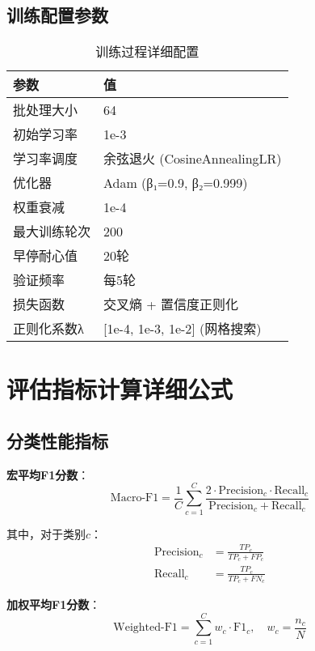 \subsection{训练配置参数}
\label{app:training_config}

\begin{table}[h]
\centering
\caption{训练过程详细配置}
\label{tab:training_config_details}
\begin{tabular}{ll}
\toprule
\textbf{参数} & \textbf{值} \\
\midrule
批处理大小 & 64 \\
初始学习率 & 1e-3 \\
学习率调度 & 余弦退火 (CosineAnnealingLR) \\
优化器 & Adam (β₁=0.9, β₂=0.999) \\
权重衰减 & 1e-4 \\
最大训练轮次 & 200 \\
早停耐心值 & 20轮 \\
验证频率 & 每5轮 \\
损失函数 & 交叉熵 + 置信度正则化 \\
正则化系数λ & [1e-4, 1e-3, 1e-2] (网格搜索) \\
\bottomrule
\end{tabular}
\end{table}

\section{评估指标计算详细公式}
\label{app:metrics_formulas}

\subsection{分类性能指标}
\label{app:classification_metrics}

\textbf{宏平均F1分数}：
\begin{equation}
\text{Macro-F1} = \frac{1}{C} \sum_{c=1}^{C} \frac{2 \cdot \text{Precision}_c \cdot \text{Recall}_c}{\text{Precision}_c + \text{Recall}_c}
\label{eq:macro_f1_detailed}
\end{equation}

其中，对于类别$c$：
\begin{align}
\text{Precision}_c &= \frac{TP_c}{TP_c + FP_c} \\
\text{Recall}_c &= \frac{TP_c}{TP_c + FN_c}
\end{align}

\textbf{加权平均F1分数}：
\begin{equation}
\text{Weighted-F1} = \sum_{c=1}^{C} w_c \cdot \text{F1}_c, \quad w_c = \frac{n_c}{N}
\label{eq:weighted_f1}
\end{equation}

